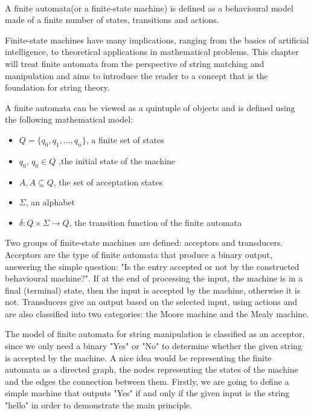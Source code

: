 \documentclass[letterpaper]{article}
\begin{document}
\paragraph{}

A finite automata(or a finite-state machine) is defined as a behavioural model made of a finite number of states, transitions and actions. 

Finite-state machines have many implications, ranging from the basics of artificial intelligence, to theoretical applications in mathematical problems. This chapter will treat finite automata from the perspective of string matching and manipulation and aims to introduce the reader to a concept that is the foundation for string theory. 

A finite automata can be viewed as a quintuple of objects and is defined using the following mathematical model:

\begin{itemize}
    \item $Q = \{ q_0, q_1, \dots , q_n \}$, a finite set of states
    \item $q_0$, $q_0 \in Q$ ,the initial state of the machine
    \item $A, A  \subseteq Q$, the set of acceptation states
    \item $\Sigma$, an alphabet
    \item $\delta : Q \times \Sigma \rightarrow Q$, the transition function of the finite automata
\end{itemize}

Two groups of finite-state machines are defined: acceptors and transducers. Acceptors are the type of finite automata that produce a binary output, answering the simple question: "Is the entry accepted or not by the constructed behavioural machine?". If at the end of processing the input, the machine is in a final (terminal) state, then the input is accepted by the machine, otherwise it is not. Transducers give an output based on the selected input, using actions and are also classified into two categories: the Moore machine and the Mealy machine.

The model of finite automata for string manipulation is classified as an acceptor, since we only need a binary "Yes" or "No" to determine whether the given string is accepted by the machine. A nice idea would be representing the finite automata as a directed graph, the nodes representing the states of the machine and the edges the connection between them. Firstly, we are going to define a simple machine that outputs "Yes" if and only if the given input is the string "hello" in order to demonstrate the main principle.
\end{document}
